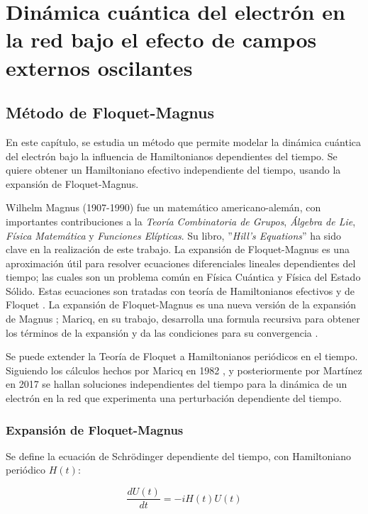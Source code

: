 \chapter{Dinámica cuántica del electrón en la red bajo el efecto de campos externos oscilantes}

\section{Método de Floquet-Magnus}\label{cap:8}

En este capítulo, se estudia un método que permite modelar la dinámica cuántica del electrón bajo la influencia de Hamiltonianos dependientes del tiempo. Se quiere obtener un Hamiltoniano efectivo independiente del tiempo, usando la expansión de Floquet-Magnus.  

Wilhelm Magnus (1907-1990) fue un matemático americano-alemán, con importantes contribuciones a la \textit{Teoría Combinatoria de Grupos}, \textit{Álgebra de Lie}, \textit{Física Matemática} y \textit{Funciones Elípticas}. Su libro, ''\textit{Hill's Equations}'' ha sido clave en la realización de este trabajo. La expansión de Floquet-Magnus es una aproximación útil para resolver ecuaciones diferenciales lineales dependientes del tiempo; las cuales son un problema común en Física Cuántica y Física del Estado Sólido. Estas ecuaciones son tratadas con teoría de Hamiltonianos efectivos y de Floquet \cite{mananga}.
La expansión de Floquet-Magnus es una nueva versión de la expansión de Magnus \cite{maricq}; Maricq, en su trabajo, desarrolla una formula recursiva para obtener los términos de la expansión y da las condiciones para su convergencia \cite{mananga}.

Se puede extender la Teoría de Floquet a Hamiltonianos periódicos en el tiempo. Siguiendo los cálculos hechos por Maricq en 1982 \cite{maricq}, y posteriormente por Martínez en 2017 \cite{martinez2017} se hallan soluciones independientes del tiempo para la dinámica de un electrón en la red que experimenta una perturbación dependiente del tiempo.

\subsection{Expansión de Floquet-Magnus}\label{cap:8.1}

Se define la ecuación de Schrödinger dependiente del tiempo, con Hamiltoniano periódico $H(t)$:

\begin{equation}\label{eq:8.1}
    \frac{dU(t)}{dt}=-iH(t)U(t)
\end{equation}

